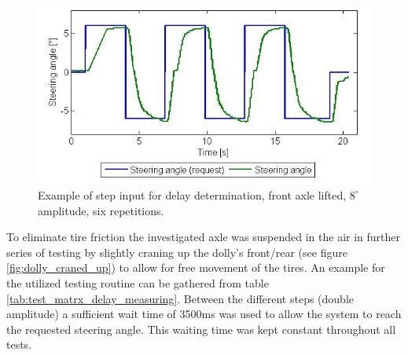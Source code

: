 \documentclass[ExampleMasters.tex]{subfiles}
\begin{document}
\begin{figure} [!htb]
\centering
\includegraphics[width=1\linewidth]{figures/example_for_step_input_delay_measuring}
\caption{Example of step input for delay determination, front axle lifted, $8^\circ $ amplitude, six repetitions.}
\label{fig:example_for_step_input_delay_measuring}
\end{figure}


To eliminate tire friction the investigated axle was suspended in the air in further series of testing by slightly craning up the dolly's front/rear (see figure \ref{fig:dolly_craned_up}) to allow for free movement of the tires. An example for the utilized testing routine can be gathered from table \ref{tab:test_matrx_delay_measuring}. Between the different steps (double amplitude) a sufficient wait time of 3500ms was used to allow the system to reach the requested steering angle. This waiting time was kept constant throughout all tests. \\
\end{document}
